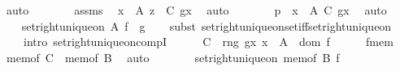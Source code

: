 \begin{isabellebody}
\ auto\isanewline
\ \ \ \ \isamarkupfalse%
\ \isamarkupfalse%
\ assms\ \isamarkupfalse%
\ {\isachardoublequoteopen}x\ {\isasymin}\ A{\isachardoublequoteclose}\ {\isachardoublequoteopen}z\ {\isasymin}\ C\ {\isacharparenleft}{\kern0pt}g{\isacharbackquote}{\kern0pt}x{\isacharparenright}{\kern0pt}{\isachardoublequoteclose}\ \isamarkupfalse%
\ auto\isanewline
\ \ \ \ \isamarkupfalse%
\ \isamarkupfalse%
\ {\isachardoublequoteopen}p\ {\isasymin}\ {\isasymSum}x\ {\isasymin}\ A{\isachardot}{\kern0pt}\ {\isacharparenleft}{\kern0pt}C\ {\isacharparenleft}{\kern0pt}g{\isacharbackquote}{\kern0pt}x{\isacharparenright}{\kern0pt}{\isacharparenright}{\kern0pt}{\isachardoublequoteclose}\ \isamarkupfalse%
\ auto\isanewline
\ \ \isamarkupfalse%
\isanewline
{}\isamarkupfalse%
\isanewline
\ \ \isamarkupfalse%
\ {\isachardoublequoteopen}set{\isacharunderscore}{\kern0pt}right{\isacharunderscore}{\kern0pt}unique{\isacharunderscore}{\kern0pt}on\ A\ {\isacharparenleft}{\kern0pt}f\ {\isasymcirc}\ g{\isacharparenright}{\kern0pt}{\isachardoublequoteclose}\isanewline
\ \ \isamarkupfalse%
\ {\isacharparenleft}{\kern0pt}subst\ set{\isacharunderscore}{\kern0pt}right{\isacharunderscore}{\kern0pt}unique{\isacharunderscore}{\kern0pt}on{\isacharunderscore}{\kern0pt}set{\isacharunderscore}{\kern0pt}iff{\isacharunderscore}{\kern0pt}set{\isacharunderscore}{\kern0pt}right{\isacharunderscore}{\kern0pt}unique{\isacharunderscore}{\kern0pt}on{\isacharcomma}{\kern0pt}\isanewline
\ \ \ \ intro\ set{\isacharunderscore}{\kern0pt}right{\isacharunderscore}{\kern0pt}unique{\isacharunderscore}{\kern0pt}on{\isacharunderscore}{\kern0pt}compI{\isacharparenright}{\kern0pt}\isanewline
\ \ \ \ \isamarkupfalse%
\ {\isacharquery}{\kern0pt}C\ {\isacharequal}{\kern0pt}\ {\isachardoublequoteopen}rng\ g{\isasymrestriction}\isactrlbsub {\isasymlambda}x{\isachardot}{\kern0pt}\ x\ {\isasymin}\ A\isactrlesub \ {\isasyminter}\ dom\ f{\isachardoublequoteclose}\isanewline
\ \ \ \ \isamarkupfalse%
\ f{\isacharunderscore}{\kern0pt}mem\ \isamarkupfalse%
\ {\isachardoublequoteopen}mem{\isacharunderscore}{\kern0pt}of\ {\isacharquery}{\kern0pt}C\ {\isasymle}\ mem{\isacharunderscore}{\kern0pt}of\ B{\isachardoublequoteclose}\ \isamarkupfalse%
\ auto\isanewline
\ \ \ \ \isamarkupfalse%
\ \isamarkupfalse%
\ {\isachardoublequoteopen}set{\isacharunderscore}{\kern0pt}right{\isacharunderscore}{\kern0pt}unique{\isacharunderscore}{\kern0pt}on\ {\isacharparenleft}{\kern0pt}mem{\isacharunderscore}{\kern0pt}of\ B{\isacharparenright}{\kern0pt}\ f{\isachardoublequoteclose}\ \isamarkupfalse%

\end{isabellebody}
